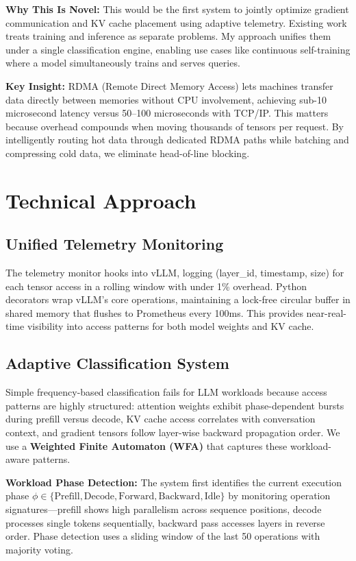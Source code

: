 \documentclass[10pt,letterpaper]{article}
\begin{document}
\textbf{Why This Is Novel:} This would be the first system to jointly optimize gradient communication and KV cache placement using adaptive telemetry. Existing work treats training and inference as separate problems. My approach unifies them under a single classification engine, enabling use cases like continuous self-training where a model simultaneously trains and serves queries.

\textbf{Key Insight:} RDMA (Remote Direct Memory Access) lets machines transfer data directly between memories without CPU involvement, achieving sub-10 microsecond latency versus 50--100 microseconds with TCP/IP. This matters because overhead compounds when moving thousands of tensors per request. By intelligently routing hot data through dedicated RDMA paths while batching and compressing cold data, we eliminate head-of-line blocking.

\section{Technical Approach}

\subsection{Unified Telemetry Monitoring}
The telemetry monitor hooks into vLLM, logging (layer\_id, timestamp, size) for each tensor access in a rolling window with under 1\% overhead. Python decorators wrap vLLM's core operations, maintaining a lock-free circular buffer in shared memory that flushes to Prometheus every 100ms. This provides near-real-time visibility into access patterns for both model weights and KV cache.

\subsection{Adaptive Classification System}
Simple frequency-based classification fails for LLM workloads because access patterns are highly structured: attention weights exhibit phase-dependent bursts during prefill versus decode, KV cache access correlates with conversation context, and gradient tensors follow layer-wise backward propagation order. We use a \textbf{Weighted Finite Automaton (WFA)} that captures these workload-aware patterns.

\textbf{Workload Phase Detection:} The system first identifies the current execution phase $\phi \in \{\text{Prefill}, \text{Decode}, \text{Forward}, \text{Backward}, \text{Idle}\}$ by monitoring operation signatures---prefill shows high parallelism across sequence positions, decode processes single tokens sequentially, backward pass accesses layers in reverse order. Phase detection uses a sliding window of the last 50 operations with majority voting.
\end{document}

